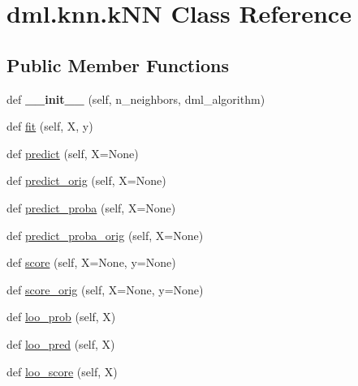 \hypertarget{classdml_1_1knn_1_1kNN}{}\section{dml.\+knn.\+k\+NN Class Reference}
\label{classdml_1_1knn_1_1kNN}
\subsection*{Public Member Functions}
\begin{DoxyCompactItemize}
\item 
def {\bfseries \+\_\+\+\_\+init\+\_\+\+\_\+} (self, n\+\_\+neighbors, dml\+\_\+algorithm)\hypertarget{classdml_1_1knn_1_1kNN_abbda5364bee7587be31e8ae0acec4751}{}\label{classdml_1_1knn_1_1kNN_abbda5364bee7587be31e8ae0acec4751}

\item 
def \hyperlink{classdml_1_1knn_1_1kNN_a1ce29c6372bba3a1c2ba949c6d0ce887}{fit} (self, X, y)
\item 
def \hyperlink{classdml_1_1knn_1_1kNN_a1b5f00f663698597fb9b99ae53885bd0}{predict} (self, X=None)
\item 
def \hyperlink{classdml_1_1knn_1_1kNN_aa5cc1e3c3c1681ec175fa65dc0e1f2c9}{predict\+\_\+orig} (self, X=None)
\item 
def \hyperlink{classdml_1_1knn_1_1kNN_abb377a697d13ea7d3b6cc57a4778f6ca}{predict\+\_\+proba} (self, X=None)
\item 
def \hyperlink{classdml_1_1knn_1_1kNN_ad54d73b25d19d09bd8ed02fc969bc613}{predict\+\_\+proba\+\_\+orig} (self, X=None)
\item 
def \hyperlink{classdml_1_1knn_1_1kNN_a2c7049076353475591433ca7430764ac}{score} (self, X=None, y=None)
\item 
def \hyperlink{classdml_1_1knn_1_1kNN_a57cee41b21103f6989eecb609423ed58}{score\+\_\+orig} (self, X=None, y=None)
\item 
def \hyperlink{classdml_1_1knn_1_1kNN_abf52cd58d4fc79709c7b8301ec532ed6}{loo\+\_\+prob} (self, X)
\item 
def \hyperlink{classdml_1_1knn_1_1kNN_a25747919b092e11e5050507eb34dd814}{loo\+\_\+pred} (self, X)
\item 
def \hyperlink{classdml_1_1knn_1_1kNN_aef6fd586e89eded5648d16d00c9b7a7f}{loo\+\_\+score} (self, X)
\end{DoxyCompactItemize}
